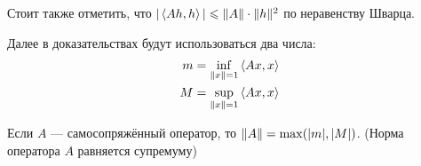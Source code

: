 \documentclass[12pt]{article}
\begin{document}
	Стоит также отметить, что $|\, \langle Ah, h \rangle \,| \leqslant \| A \| \cdot \| h \|^2$ по неравенству Шварца.
	
	Далее в доказательствах будут использоваться два числа:
	$$
		\begin{aligned}
			m &= \underset{\| x \| = 1}{\inf} \, \langle Ax, x \rangle \, \\
			M &= \underset{\| x \| = 1}{\sup} \, \langle Ax, x \rangle \,
		\end{aligned}
	$$
	
	\begin{state}
		Если $A$ --- самосопряжённый оператор, то $\| A \| = \max(|m|, |M|)$. (Норма оператора $A$ равняется супремуму)
	\end{state}
	
\end{document}

